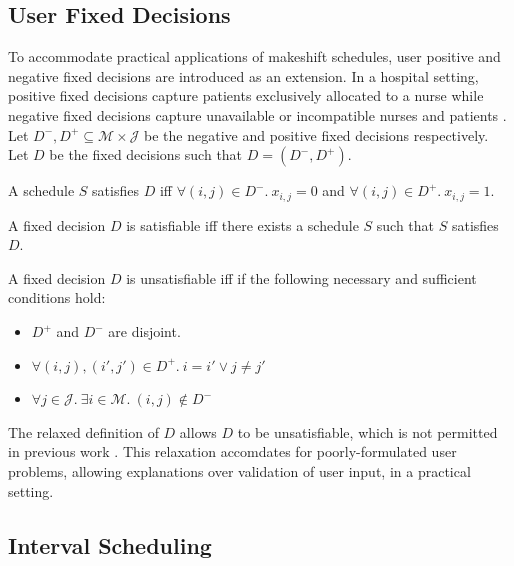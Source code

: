 \subsection{User Fixed Decisions}

To accommodate practical applications of makeshift schedules, user positive and negative fixed decisions are introduced as an extension. In a hospital setting, positive fixed decisions capture patients exclusively allocated to a nurse while negative fixed decisions capture unavailable or incompatible nurses and patients \cite{aes}. Let $D^-,D^+\subseteq\mathcal{M}\times\mathcal{J}$ be the negative and positive fixed decisions respectively. Let $D$ be the fixed decisions such that $D=(D^-,D^+)$.

\begin{definition}
	A schedule $S$ satisfies $D$ iff $\forall(i,j)\in D^-.\ x_{i,j}=0$ and $\forall (i,j)\in D^+.\ x_{i,j}=1$.
\end{definition}

\begin{definition}
	A fixed decision $D$ is satisfiable iff there exists a schedule $S$ such that $S$ satisfies $D$. 
\end{definition}

\begin{theorem}
	A fixed decision $D$ is unsatisfiable iff if the following necessary and sufficient conditions hold:
	\begin{itemize}
		\item$D^+$ and $D^-$ are disjoint.
		\item$\forall(i,j),(i',j')\in D^+.\ i=i'\lor j\neq j'$
		\item$\forall j\in\mathcal{J}.\ \exists i\in\mathcal{M}.\ (i,j)\not\in D^-$
	\end{itemize}
\end{theorem}

The relaxed definition of $D$ allows $D$ to be unsatisfiable, which is not permitted in previous work \cite{aes}. This relaxation accomdates for poorly-formulated user problems, allowing explanations over validation of user input, in a practical setting.

\subsection{Interval Scheduling}

